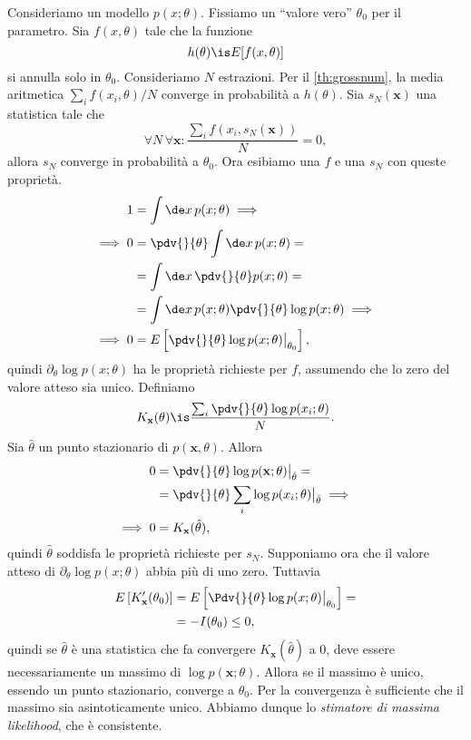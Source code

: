 Consideriamo un modello $p(x;\theta)$.
Fissiamo un ``valore vero'' $\theta_0$ per il parametro.
%
Sia $f(x,\theta)$ tale che la funzione
\begin{equation*}
	h(\theta)\is E[f(x,\theta)]
\end{equation*}
si annulla solo in $\theta_0$.
Consideriamo $N$ estrazioni.
Per il \autoref{th:grossnum},
la media aritmetica $\sum_i f(x_i,\theta)/N$ converge in probabilità a $h(\theta)$.
Sia $s_N(\mathbf x)$ una statistica tale che
\begin{equation*}
	\forall N \,\forall\mathbf x: \frac{\sum_i f(x_i,s_N(\mathbf x))}N = 0,
\end{equation*}
allora $s_N$ converge in probabilità a $\theta_0$.
%
Ora esibiamo una $f$ e una $s_N$ con queste proprietà.
\begin{align*}
	1
	&= \int\de x\, p(x;\theta) \implies \\
	\implies 0
	&= \pdv{}{\theta} \int\de x\, p(x;\theta) = \\
	&= \int\de x\, \pdv{}{\theta} p(x;\theta) = \\
	&= \int\de x\, p(x;\theta) \pdv{}{\theta} \log p(x;\theta) \implies \\
	\implies 0
	&= E \left[ \pdv{}{\theta} \log p(x;\theta) \big|_{\theta_0} \right],
\end{align*}
quindi $\partial_\theta \log p(x;\theta)$ ha le proprietà richieste per $f$,
assumendo che lo zero del valore atteso sia unico.
Definiamo
\begin{equation*}
	K_{\mathbf x}(\theta)
	\is \frac{\sum_i \pdv{}{\theta} \log p(x_i;\theta)} N.
\end{equation*}
Sia $\hat\theta$ un punto stazionario di $p(\mathbf x,\theta)$.
Allora
\begin{align*}
	0
	&= \pdv{}{\theta} \log p(\mathbf x;\theta) \big|_{\hat\theta} = \\
	&= \pdv{}{\theta} \sum_i \log p(x_i;\theta) \big|_{\hat\theta} \implies \\
	\implies 0
	&= K_{\mathbf x}(\hat\theta),
\end{align*}
quindi $\hat\theta$ soddisfa le proprietà richieste per $s_N$.
Supponiamo ora che il valore atteso di
$\partial_\theta \log p(x;\theta)$
abbia più di uno zero.
Tuttavia
\begin{align*}
	E \left[ K_{\mathbf x}'(\theta_0) \right]
	&= E \left[ \Pdv{}{\theta} \log p(x;\theta) \big|_{\theta_0} \right] = \\
	&= -I(\theta_0)
	\le 0,
\end{align*}
quindi se $\hat\theta$ è una statistica che fa convergere $K_{\mathbf x}(\hat\theta)$ a $0$,
deve essere necessariamente un massimo di $\log p(\mathbf x;\theta)$.
%
Allora se il massimo è unico, essendo un punto stazionario,
converge a $\theta_0$.
Per la convergenza è sufficiente che il massimo sia asintoticamente unico.
Abbiamo dunque lo \emph{stimatore di massima likelihood},
che è consistente.

